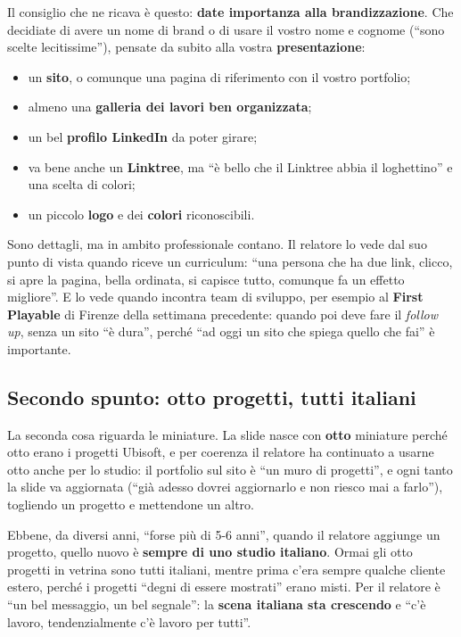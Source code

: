 Il consiglio che ne ricava è questo: \textbf{date importanza alla
brandizzazione}. Che decidiate di avere un nome di brand o di usare il vostro nome
e cognome (``sono scelte lecitissime''), pensate da subito alla vostra
\textbf{presentazione}:
\begin{itemize}
  \item un \textbf{sito}, o comunque una pagina di riferimento con il vostro
        portfolio;
  \item almeno una \textbf{galleria dei lavori ben organizzata};
  \item un bel \textbf{profilo LinkedIn} da poter girare;
  \item va bene anche un \textbf{Linktree}, ma ``è bello che il Linktree abbia il
        loghettino'' e una scelta di colori;
  \item un piccolo \textbf{logo} e dei \textbf{colori} riconoscibili.
\end{itemize}
Sono dettagli, ma in ambito professionale contano. Il relatore lo vede dal suo
punto di vista quando riceve un curriculum: ``una persona che ha due link,
clicco, si apre la pagina, bella ordinata, si capisce tutto, comunque fa un
effetto migliore''. E lo vede quando incontra team di sviluppo, per esempio al
\textbf{First Playable} di Firenze della settimana precedente: quando poi deve
fare il \emph{follow up}, senza un sito ``è dura'', perché ``ad oggi un sito che
spiega quello che fai'' è importante.

\subsection{Secondo spunto: otto progetti, tutti italiani}

La seconda cosa riguarda le miniature. La slide nasce con \textbf{otto}
miniature perché otto erano i progetti Ubisoft, e per coerenza il relatore ha
continuato a usarne otto anche per lo studio: il portfolio sul sito è ``un muro
di progetti'', e ogni tanto la slide va aggiornata (``già adesso dovrei
aggiornarlo e non riesco mai a farlo''), togliendo un progetto e mettendone un
altro.

Ebbene, da diversi anni, ``forse più di 5-6 anni'', quando il relatore aggiunge
un progetto, quello nuovo è \textbf{sempre di uno studio italiano}. Ormai gli otto
progetti in vetrina sono tutti italiani, mentre prima c'era sempre qualche
cliente estero, perché i progetti ``degni di essere mostrati'' erano misti. Per
il relatore è ``un bel messaggio, un bel segnale'': la \textbf{scena italiana
sta crescendo} e ``c'è lavoro, tendenzialmente c'è lavoro per tutti''.

